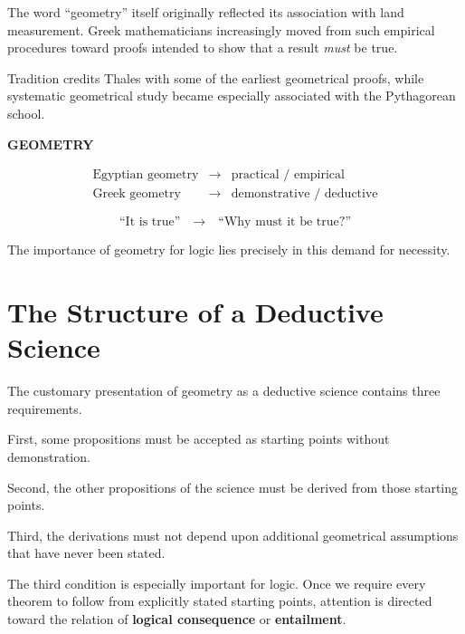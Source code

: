 \documentclass[11pt]{article}
\begin{document}
The word ``geometry'' itself originally reflected its association
with land measurement. Greek mathematicians increasingly moved
from such empirical procedures toward proofs intended to show
that a result \emph{must} be true.

Tradition credits Thales with some of the earliest geometrical
proofs, while systematic geometrical study became especially
associated with the Pythagorean school.

\begin{whiteboard}
\textbf{GEOMETRY}

\[
\begin{array}{rcl}
\text{Egyptian geometry}
&\longrightarrow&
\text{practical / empirical}
\\[0.4em]
\text{Greek geometry}
&\longrightarrow&
\text{demonstrative / deductive}
\end{array}
\]

\vspace{0.4em}

\[
\text{``It is true''}
\quad\longrightarrow\quad
\text{``Why must it be true?''}
\]
\end{whiteboard}

The importance of geometry for logic lies precisely in this demand
for necessity.

\section{The Structure of a Deductive Science}

The customary presentation of geometry as a deductive science
contains three requirements.

First, some propositions must be accepted as starting points
without demonstration.

Second, the other propositions of the science must be derived
from those starting points.

Third, the derivations must not depend upon additional
geometrical assumptions that have never been stated.

The third condition is especially important for logic. Once we
require every theorem to follow from explicitly stated starting
points, attention is directed toward the relation of
\textbf{logical consequence} or \textbf{entailment}.
\end{document}
